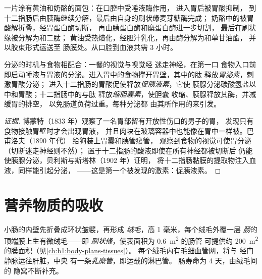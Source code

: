 \begin{example}[一餐中的化学变化]\label{ex:b1:digestion-absorption:meal}
一片涂有黄油和奶酪的面包：在口腔中受唾液酶作用，
进入胃后被胃酸抑制，
到十二指肠后由胰酶继续分解，最后由自身的刷状缘麦芽糖酶完成；
奶酪中的被胃酸解折叠，经胃蛋白酶切断，
再由胰蛋白酶和糜蛋白酶进一步切割，
最后在刷状缘被分解为和二肽；
黄油受热熔化，经胆汁乳化，再由酶分解为和单甘油酯，
并以胶束形式运送至
肠膜处。从口腔到血液共需 3 小时。
\end{example}

\begin{proposition}[分泌的调控]\label{prop:b1:digestion-absorption:control}
分泌的时机与食物相配合：一餐的视觉与嗅觉经
迷走神经，在第一口
食物入口前即启动唾液与胃液的分泌。进入胃中的食物撑开胃壁，其中的肽
释放\emph{胃泌素}，刺激胃酸分泌；
进入十二指肠的胃酸促使释放\emph{促胰液素}，它使
胰腺分泌碳酸氢盐以中和胃酸；十二指肠中的与肽
释放\emph{缩胆囊素}，使胆囊
收缩、胰腺释放其酶，并减缓胃的排空，
以免肠道负荷过重。每种分泌都
由其所作用的来引发。
\end{proposition}
\begin{proof}[证据]
博蒙特（1833 年）观察了一名胃部留有开放性伤口的男子的胃，
发现只有食物接触胃壁时才会出现胃液，
并且肉块在玻璃容器中也能像在胃中一样被。巴甫洛夫（1890 年代）
给狗装上胃囊和胰管瘘管，
观察到食物的视觉可使胃分泌（切断迷走神经则不然）；
置于十二指肠的酸液即使在所有神经都被切断后
仍能使胰腺分泌，贝利斯与斯塔林（1902 年）证明，
将十二指肠黏膜的提取物注入血液，同样能引起分泌，
——这是第一个被发现的激素：促胰液素。
\end{proof}

\section{营养物质的吸收}

\begin{definition}[吸收表面]\label{def:b1:digestion-absorption:surface}
小肠的内壁先折叠成环状皱襞，再形成
\emph{绒毛}，高 1 毫米，每个绒毛外覆一层
\emph{肠}的顶端膜上生有微绒毛——即
\emph{刷状缘}，使表面积为 \qty{0.6}{m^2} 的肠管
可提供约 \qty{200}{m^2} 的膜面积（见\cref{ch:b1:body-plans-tissues}）。
每个绒毛内有毛细血管网，将与
经门静脉运往肝脏，中央
有一条\emph{乳糜管}，即运载的淋巴管。
肠寿命为 4 天，由绒毛间的
隐窝不断补充。
\end{definition}

